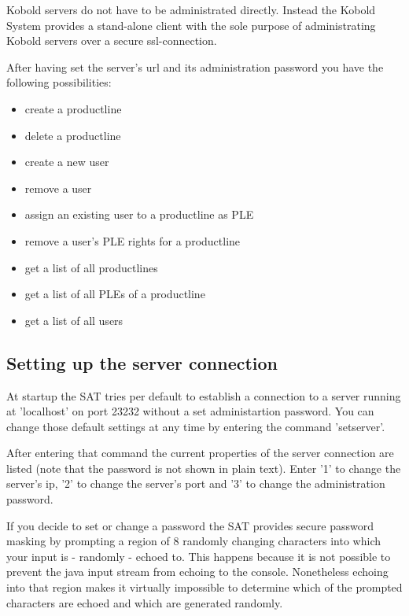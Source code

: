 Kobold servers do not have to be administrated directly. Instead the Kobold System 
provides a stand-alone client with the sole purpose of administrating Kobold servers 
over a secure ssl-connection. \par

After having set the server's url and its administration password you have the following 
possibilities:

\begin{itemize}
	\item create a productline
	\item delete a productline
	\item create a new user
	\item remove a user
	\item assign an existing user to a productline as PLE
	\item remove a user's PLE rights for a productline
	\item get a list of all productlines
	\item get a list of all PLEs of a productline
	\item get a list of all users
\end{itemize}




\subsection{Setting up the server connection}
At startup the SAT tries per default to establish a connection to a server running 
at 'localhost' on port 23232 without a set administartion password. You can change
those default settings at any time by entering the command 'setserver'.\par

After entering that command the current properties of the server connection are 
listed (note that the password is not shown in plain text). Enter '1' to change
the server's ip, '2' to change the server's port and '3' to change the administration
password.\par

If you decide to set or change a password the SAT provides secure password masking by
prompting a region of 8 randomly changing characters into which your input is - randomly - 
echoed to. This happens because it is not possible to prevent the java input stream from
echoing to the console. Nonetheless echoing into that region makes it virtually impossible 
to determine which of the prompted characters are echoed and which are generated randomly.\par

